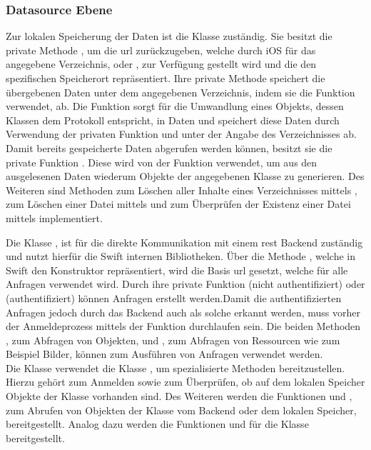 \subsubsection{Datasource Ebene}
Zur lokalen Speicherung der Daten ist die Klasse  zuständig.
Sie besitzt die private Methode , um die \gls{url} zurückzugeben, welche durch iOS für das angegebene Verzeichnis,  oder , zur Verfügung gestellt wird und die den spezifischen Speicherort repräsentiert.
Ihre private Methode  speichert die übergebenen Daten unter dem angegebenen Verzeichnis, indem sie die Funktion  verwendet, ab.
Die Funktion   sorgt für die Umwandlung eines Objekts, dessen Klassen dem  Protokoll entspricht, in Daten und speichert diese Daten durch Verwendung der privaten Funktion  und unter der Angabe des Verzeichnisses ab.
Damit bereits gespeicherte Daten abgerufen werden können, besitzt sie die private Funktion . Diese wird von der Funktion  verwendet, um aus den ausgelesenen Daten wiederum Objekte der angegebenen Klasse zu generieren.
Des Weiteren sind Methoden zum Löschen aller Inhalte eines Verzeichnisses mittels , zum Löschen einer Datei mittels  und zum Überprüfen der Existenz einer Datei mittels  implementiert.

\clearpage

Die Klasse , ist für die direkte Kommunikation mit einem \gls{rest} Backend zuständig und nutzt hierfür die Swift internen Bibliotheken.
Über die Methode , welche in Swift den Konstruktor repräsentiert, wird die Basis \gls{url} gesetzt, welche für alle Anfragen verwendet wird.
Durch ihre private Funktion  (nicht authentifiziert) oder  (authentifiziert) können Anfragen erstellt werden.Damit die authentifizierten Anfragen jedoch durch das Backend auch als solche erkannt werden, muss vorher der Anmeldeprozess mittels der Funktion  durchlaufen sein.
Die beiden Methoden , zum Abfragen von Objekten, und , zum Abfragen von Ressourcen wie zum Beispiel Bilder, können zum Ausführen von Anfragen verwendet werden.
\\
Die Klasse  verwendet die Klasse , um spezialisierte Methoden bereitzustellen.
Hierzu gehört  zum Anmelden sowie  zum Überprüfen, ob auf dem lokalen Speicher Objekte der Klasse  vorhanden sind.
Des Weiteren werden die Funktionen  und , zum Abrufen von Objekten der Klasse  vom Backend oder dem lokalen Speicher, bereitgestellt. Analog dazu werden die Funktionen  und  für die Klasse  bereitgestellt.

